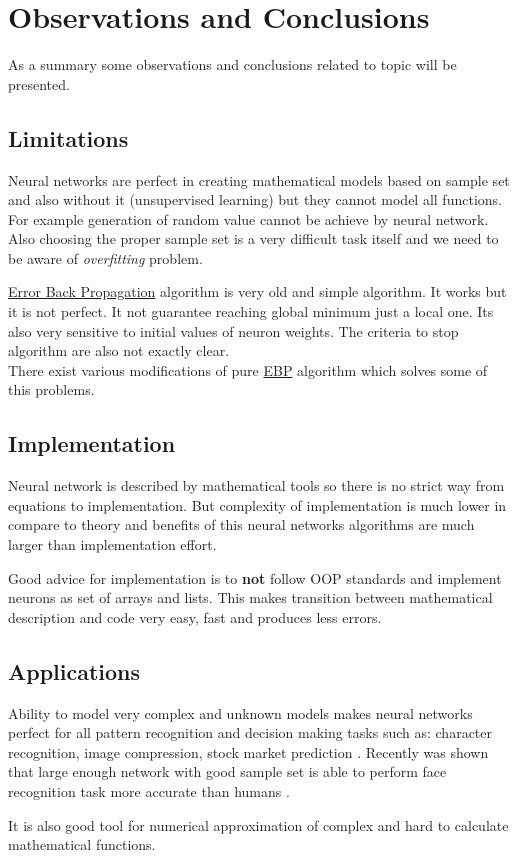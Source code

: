 \section{Observations and Conclusions}
\label{ObservationsConclusions}

As a summary some observations and conclusions related to topic will be presented.

\subsection{Limitations} 
\label{Limitations}

 \cite{mlpPawelRosczak} Neural networks are perfect in creating mathematical models based on sample set and also without it (unsupervised learning) but they cannot model all functions. For example generation of random value cannot be achieve by neural network. Also choosing the proper sample set is a very difficult task itself and we need to be aware of \textit{overfitting} problem.

\hyperref[sec:Training]{Error Back Propagation} algorithm is very old and simple algorithm. It works but it is not perfect. It not guarantee reaching global minimum just a local one. Its also very sensitive to initial values of neuron weights. The criteria to stop algorithm are also not exactly clear. \\
There exist various modifications of pure \hyperref[sec:Training]{EBP} algorithm which solves some of this problems.

\subsection{Implementation}
\label{Implementation}

Neural network is described by mathematical tools so there is no strict way from equations to implementation.
But complexity of implementation is much lower in compare to theory and benefits of this neural networks algorithms are much larger than implementation effort.

Good advice for implementation is to \textbf{not} follow OOP standards and implement neurons as set of arrays and lists. This makes transition between mathematical description and code very easy, fast and produces less errors.


\subsection{Applications}
\label{Applications}

Ability to model very complex and unknown models makes neural networks perfect for all pattern recognition and decision making tasks such as: character recognition, image compression, stock market prediction \cite{fsmlpDwrSkrMk}. Recently was shown that large enough network with good sample set is able to perform face recognition task more accurate than humans \cite{facePR}.

It is also good tool for numerical approximation of complex and hard to calculate mathematical functions.